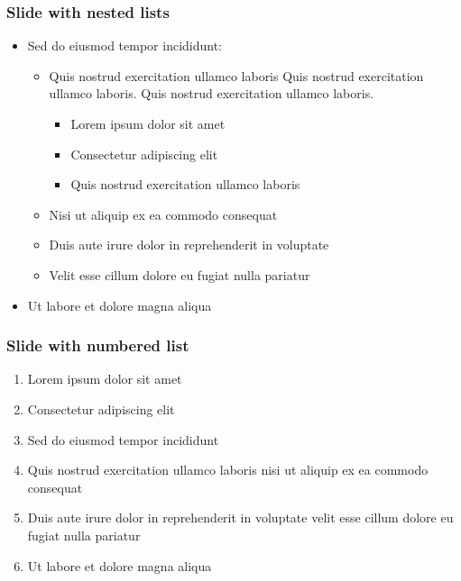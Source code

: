 \documentclass[11pt,xcolor={dvipsnames},hyperref={pdftex,pdfpagemode=UseNone,hidelinks,pdfdisplaydoctitle=true},usepdftitle=false]{beamer}
\begin{document}
\begin{frame}
\frametitle{Slide with nested lists}
\begin{itemize}
\item Sed do eiusmod tempor incididunt:
\begin{itemize}
\item Quis nostrud exercitation ullamco laboris Quis nostrud exercitation ullamco laboris. Quis nostrud exercitation ullamco laboris. 
\begin{itemize}
\item Lorem ipsum dolor sit amet
\item Consectetur adipiscing elit
\item Quis nostrud exercitation ullamco laboris
\end{itemize}
\item Nisi ut aliquip ex ea commodo consequat
\item Duis aute irure dolor in reprehenderit in voluptate
\item Velit esse cillum dolore eu fugiat nulla pariatur
\end{itemize}
\item Ut labore et dolore magna aliqua
\end{itemize}
\end{frame}

\begin{frame}
\frametitle{Slide with numbered list}
\begin{enumerate}
\item Lorem ipsum dolor sit amet
\item Consectetur adipiscing elit
\item Sed do eiusmod tempor incididunt
\item Quis nostrud exercitation ullamco laboris nisi ut aliquip ex ea commodo consequat
\item Duis aute irure dolor in reprehenderit in voluptate velit esse cillum dolore eu fugiat nulla pariatur
\item Ut labore et dolore magna aliqua
\end{enumerate}
\end{frame}
\end{document}
